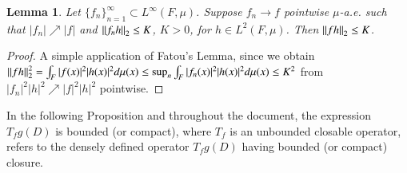 \documentclass[final,1p]{elsarticle}
\numberwithin{equation}{section}
\theoremstyle{plain}
\newtheorem{lemma}[thm]{Lemma}
\theoremstyle{definition}
\begin{document}
\begin{lemma} \label{lemma:2.0}
Let $\{ f_n \}_{n=1}^\infty \subset L^\infty(F,\mu)$.
Suppose $f_n \to f$ pointwise $\mu$-a.e. such that $|f_n| \nearrow |f|$ and ${\mbox{\ensuremath{\| {f_n h} \|}}}_2 \leq K$, $K > 0$, for $h \in L^2(F,\mu)$.
Then ${\mbox{\ensuremath{\| {f h} \|}}}_2 \leq K$.
\end{lemma}
\begin{proof}
A simple application of Fatou's Lemma, since we obtain ${\mbox{\ensuremath{\| {f h} \|}}}_2^2 = \int_F |f(x)|^2 |h(x)|^2 d\mu(x) \leq \sup_n \int_F |f_n(x)|^2|h(x)|^2 d\mu(x) \leq K^2$ from $|f_n|^2|h|^2 \nearrow |f|^2 |h|^2$ pointwise. 
\end{proof}

In the following Proposition and throughout the document,
the expression $T_fg(D)$ is bounded (or compact), where
$T_f$ is an unbounded closable
operator, refers
to the densely defined operator $T_fg(D)$ having bounded
(or compact) closure.
\end{document}
